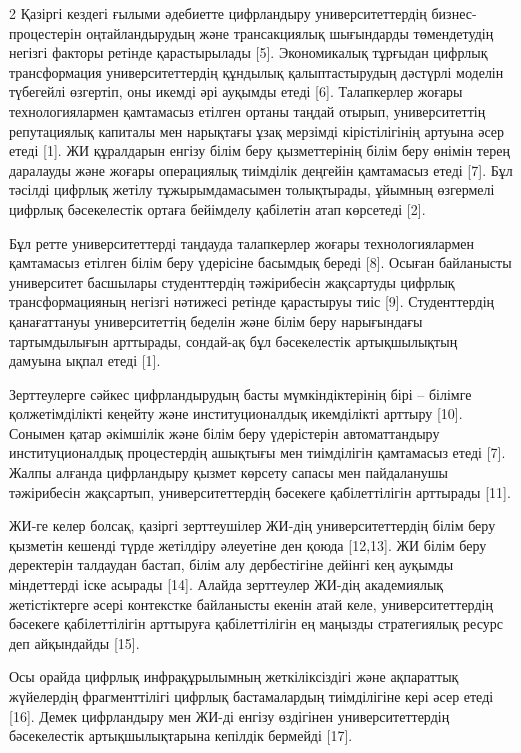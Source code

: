 \begin{multicols}{2}
Қазіргі кездегі ғылыми әдебиетте цифрландыру университеттердің
бизнес-процестерін оңтайландырудың және трансакциялық шығындарды
төмендетудің негізгі факторы ретінде қарастырылады {[}5{]}. Экономикалық
тұрғыдан цифрлық трансформация университеттердің құндылық
қалыптастырудың дәстүрлі моделін түбегейлі өзгертіп, оны икемді әрі
ауқымды етеді {[}6{]}. Талапкерлер жоғары технологиялармен қамтамасыз
етілген ортаны таңдай отырып, университеттің репутациялық капиталы мен
нарықтағы ұзақ мерзімді кірістілігінің артуына әсер етеді {[}1{]}. ЖИ
құралдарын енгізу білім беру қызметтерінің білім беру өнімін терең
даралауды және жоғары операциялық тиімділік деңгейін қамтамасыз етеді
{[}7{]}. Бұл тәсілді цифрлық жетілу тұжырымдамасымен толықтырады,
ұйымның өзгермелі цифрлық бәсекелестік ортаға бейімделу қабілетін атап
көрсетеді {[}2{]}.

Бұл ретте университеттерді таңдауда талапкерлер жоғары технологиялармен
қамтамасыз етілген білім беру үдерісіне басымдық береді {[}8{]}. Осыған
байланысты университет басшылары студенттердің тәжірибесін жақсартуды
цифрлық трансформацияның негізгі нәтижесі ретінде қарастыруы тиіс
{[}9{]}. Студенттердің қанағаттануы университеттің беделін және білім
беру нарығындағы тартымдылығын арттырады, сондай-ақ бұл бәсекелестік
артықшылықтың дамуына ықпал етеді {[}1{]}.

Зерттеулерге сәйкес цифрландырудың басты мүмкіндіктерінің бірі --
білімге қолжетімділікті кеңейту және институционалдық икемділікті
арттыру {[}10{]}. Сонымен қатар әкімшілік және білім беру үдерістерін
автоматтандыру институционалдық процестердің ашықтығы мен тиімділігін
қамтамасыз етеді {[}7{]}. Жалпы алғанда цифрландыру қызмет көрсету
сапасы мен пайдаланушы тәжірибесін жақсартып, университеттердің бәсекеге
қабілеттілігін арттырады {[}11{]}.

ЖИ-ге келер болсақ, қазіргі зерттеушілер ЖИ-дің университеттердің білім
беру қызметін кешенді түрде жетілдіру әлеуетіне ден қоюда {[}12,13{]}.
ЖИ білім беру деректерін талдаудан бастап, білім алу дербестігіне
дейінгі кең ауқымды міндеттерді іске асырады {[}14{]}. Алайда зерттеулер
ЖИ-дің академиялық жетістіктерге әсері контекстке байланысты екенін атай
келе, университеттердің бәсекеге қабілеттілігін арттыруға қабілеттілігін
ең маңызды стратегиялық ресурс деп айқындайды {[}15{]}.

Осы орайда цифрлық инфрақұрылымның жеткіліксіздігі және ақпараттық
жүйелердің фрагменттілігі цифрлық бастамалардың тиімділігіне кері әсер
етеді {[}16{]}. Демек цифрландыру мен ЖИ-ді енгізу өздігінен
университеттердің бәсекелестік артықшылықтарына кепілдік бермейді
{[}17{]}.


\end{multicols}
